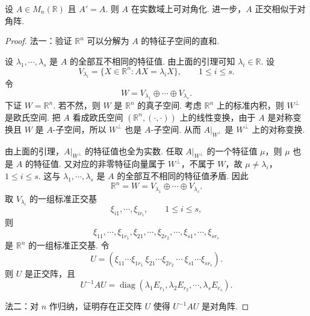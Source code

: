 \begin{theorem}
	设 $A\in M_n(\mathbb{R})$ 且 $A'=A$. 则 $A$ 在实数域上可对角化. 进一步，$A$ 正交相似于对角阵.
\end{theorem}
\begin{proof}
	法一：验证 $\mathbb{R}^n$ 可以分解为 $A$ 的特征子空间的直和.
	
	设 $\lambda_1,\cdots,\lambda_s$ 是 $A$ 的全部互不相同的特征值. 由上面的引理可知 $\lambda_i\in\mathbb{R}$. 设
	\[
	V_{\lambda_i}=\{X\in\mathbb{R}^n:AX=\lambda_iX\},
	\qquad 1\leq i\leq s.
	\]
	令
	\[
	W=V_{\lambda_1}\oplus\cdots\oplus V_{\lambda_s}.
	\]
	下证 $W=\mathbb{R}^n$. 若不然，则 $W$ 是 $\mathbb{R}^n$ 的真子空间. 考虑 $\mathbb{R}^n$ 上的标准内积，则 $W^\perp$ 是欧氏空间. 把 $A$ 看成欧氏空间 $(\mathbb{R}^n,(\cdot,\cdot))$ 上的线性变换，由于 $A$ 是对称变换且 $W$ 是 $A$-子空间，所以 $W^\perp$ 也是 $A$-子空间. 从而 $A|_{W^\perp}$ 是 $W^\perp$ 上的对称变换.
	
	由上面的引理，$A|_{W^\perp}$ 的特征值也全为实数. 任取 $A|_{W^\perp}$ 的一个特征值 $\mu$，则 $\mu$ 也是 $A$ 的特征值. 又对应的非零特征向量属于 $W^\perp$，不属于 $W$，故 $\mu\ne\lambda_i$，$1\leq i\leq s$. 这与 $\lambda_1,\cdots,\lambda_s$ 是 $A$ 的全部互不相同的特征值矛盾. 因此
	\[
	\mathbb{R}^n=W=V_{\lambda_1}\oplus\cdots\oplus V_{\lambda_s}.
	\]
	取 $V_{\lambda_i}$ 的一组标准正交基
	\[
	\xi_{i1},\cdots,\xi_{ir_i},
	\qquad 1\leq i\leq s,
	\]
	则
	\[
	\xi_{11},\cdots,\xi_{1r_1},\xi_{21},\cdots,\xi_{2r_2},\cdots,\xi_{s1},\cdots,\xi_{sr_s}
	\]
	是 $\mathbb{R}^n$ 的一组标准正交基. 令
	\[
	U=(\xi_{11}\cdots\xi_{1r_1}\ \xi_{21}\cdots\xi_{2r_2}\ \cdots\ \xi_{s1}\cdots\xi_{sr_s}).
	\]
	则 $U$ 是正交阵，且
	\[
	U^{-1}AU=\operatorname{diag}(\lambda_1E_{r_1},\lambda_2E_{r_2},\cdots,\lambda_sE_{r_s}).
	\]
	
	法二：对 $n$ 作归纳，证明存在正交阵 $U$ 使得 $U^{-1}AU$ 是对角阵.
	

\end{proof}
